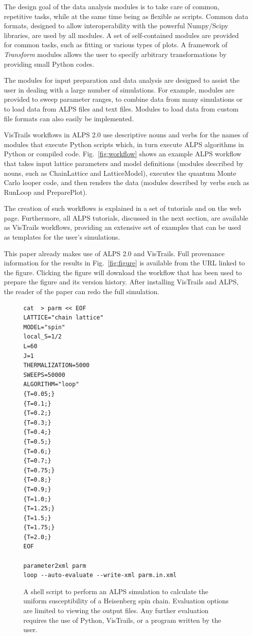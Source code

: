 \documentclass[12pt]{iopart}
\begin{document}
The design goal of the data analysis modules is to take care of common, repetitive tasks, while at the same time being as flexible as scripts.  Common data formats, designed to allow interoperability with the powerful Numpy/Scipy libraries, are used by all modules. A set of self-contained modules are provided for common tasks, such as fitting or various types of plots. A framework of {\it Transform} modules allows the user to specify arbitrary transformations by providing small Python codes.

The modules for input preparation and data analysis are designed to assist the user in dealing with a large number of simulations. For example, modules are provided to sweep parameter ranges, to combine data from many simulations or to load data from ALPS files and text files.  Modules to load data from custom file formats can also easily be implemented.

VisTrails workflows in ALPS 2.0 use descriptive nouns and verbs for the names of modules that execute
 Python scripts which, in turn execute ALPS
algorithms in Python or compiled code. Fig.~\ref{fig:workflow} shows an example ALPS workflow
that takes input lattice parameters and model definitions (modules described by nouns, such as 
 ChainLattice and LatticeModel), executes the quantum
Monte Carlo looper code, and then renders the data (modules described by verbs such as  RunLoop and PreparePlot).

The creation of such workflows is explained in a set of tutorials and on the web page. Furthermore, all ALPS tutorials, discussed in the next section, are available  as VisTrails workflows, providing an extensive set of examples that can be used as templates for the user's simulations. 

This paper already makes use of ALPS 2.0 and VisTrails. Full provenance information for the results in Fig.~\ref{fig:figure} is available from the URL linked to the figure. Clicking the figure will download the workflow that has been used to prepare the figure and its version history. After installing VisTrails and ALPS, the reader of the paper can redo the full simulation.


\begin{figure}[t]
\begin{tiny}
\begin{center}
\begin{verbatim}
cat  > parm << EOF
LATTICE="chain lattice"
MODEL="spin"
local_S=1/2
L=60
J=1
THERMALIZATION=5000
SWEEPS=50000
ALGORITHM="loop"
{T=0.05;}
{T=0.1;}
{T=0.2;}
{T=0.3;}
{T=0.4;}
{T=0.5;}
{T=0.6;}
{T=0.7;}
{T=0.75;}
{T=0.8;}
{T=0.9;}
{T=1.0;}
{T=1.25;}
{T=1.5;}
{T=1.75;}
{T=2.0;}
EOF

parameter2xml parm
loop --auto-evaluate --write-xml parm.in.xml
\end{verbatim}
\end{center}
\end{tiny}
\caption{A shell script to perform an ALPS simulation to calculate the uniform susceptibility of a Heisenberg spin chain. Evaluation options are limited to viewing the output files. Any further evaluation requires the use of Python, VisTrails, or a program written by the user.}
\label{fig:commandline}
\end{figure}
\end{document}
